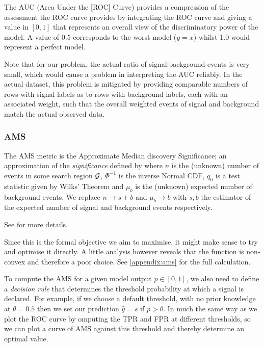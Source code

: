 The AUC (Area Under the [ROC] Curve) provides a compression of the assessment the ROC curve provides by integrating the ROC curve and giving a value in $[0,1]$ that represents an overall view of the discriminatory power of the model. A value of 0.5 corresponds to the worst model ($y=x$) whilst 1.0 would represent a perfect model. 

Note that for our problem, the actual ratio of signal:background events is very small, which would cause a problem in interpreting the AUC reliably. In the actual dataset, this problem is mitigated by providing comparable numbers of rows with signal labels as to rows with background labels, each with an associated weight, such that the overall weighted events of signal and background match the actual observed data.

\subsubsection{AMS}
The AMS metric is the Approximate Median discovery Significance;  an approximation of the \emph{significance} defined by 
where $n$ is the (unknown) number of events in some search region $\mathcal{G}$, $\Phi^{-1}$ is the inverse Normal CDF, $q_0$ is a test statistic given by Wilks' Theorem and $\mu_b$ is the (unknown) expected number of background events. We replace $n\rightarrow s+b$ and $\mu_b\rightarrow b$ with $s,b$ the estimator of the expected number of signal and background events respectively.

See \cite{HiggsML} for more details.

Since this is the formal objective we aim to maximise, it might make sense to try and optimise it directly. A little analysis however reveals that the function is non-convex and therefore a poor choice. See \ref{appendix:ams} for the full calculation.

To compute the AMS for a given model output $p \in [0,1]$, we also need to define a \emph{decision rule} that determines the threshold probability at which a signal is declared. For example, if we choose a default threshold, with no prior knowledge at $\theta = 0.5$ then we set our prediction $\hat{y} = s$ if $p > \theta$. In much the same way as we plot the ROC curve by omputing the TPR and FPR at different thresholds, so we can plot a curve of AMS against this threshold and thereby determine an optimal value. 

